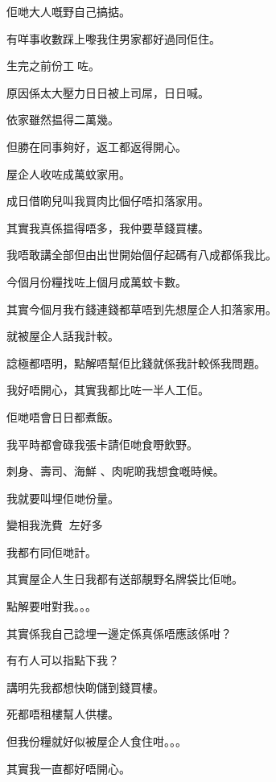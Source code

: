 佢哋大人嘅野自己搞掂。

有咩事收數踩上嚟我住男家都好過同佢住。

生完之前份工咗。

原因係太大壓力日日被上司屌，日日喊。

依家雖然揾得二萬幾。

但勝在同事夠好，返工都返得開心。

屋企人收咗成萬蚊家用。

成日借啲兒叫我買肉比個仔唔扣落家用。

其實我真係揾得唔多，我仲要草錢買樓。

我唔敢講全部但由出世開始個仔起碼有八成都係我比。

今個月份糧找咗上個月成萬蚊卡數。

其實今個月我冇錢連錢都草唔到先想屋企人扣落家用。

就被屋企人話我計較。

諗極都唔明，點解唔幫佢比錢就係我計較係我問題。

我好唔開心，其實我都比咗一半人工佢。

佢哋唔會日日都煮飯。

我平時都會碌我張卡請佢哋食嘢飲野。

刺身、壽司、海鮮 、肉呢啲我想食嘅時候。

我就要叫埋佢哋份量。

變相我洗費󰋷左好多

我都冇同佢哋計。

其實屋企人生日我都有送部靚野名牌袋比佢哋。

點解要咁對我。。。

其實係我自己諗埋一邊定係真係唔應該係咁？

有冇人可以指點下我？

講明先我都想快啲儲到錢買樓。

死都唔租樓幫人供樓。

但我份糧就好似被屋企人食住咁。。。

其實我一直都好唔開心。

